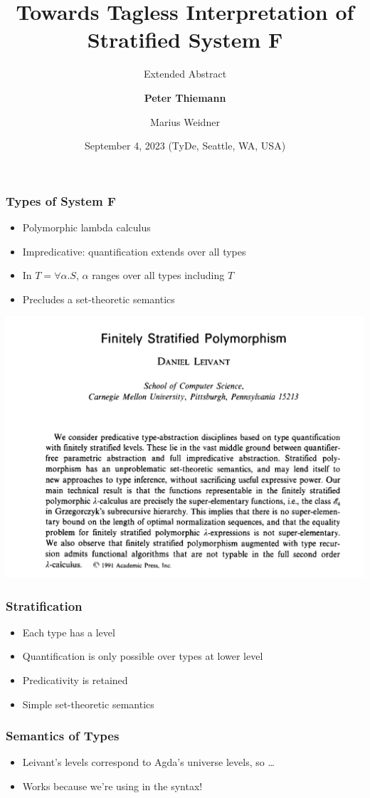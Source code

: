 \documentclass[dvipsnames,aspectratio=169,pdftex]{beamer}
\title{Towards Tagless Interpretation of Stratified System F}
\subtitle{Extended Abstract}
\author[Thiemann, Weidner]
{
\textbf{Peter Thiemann} \and
{Marius Weidner} 
}
\institute{University of Freiburg, Germany
}
\date{September 4, 2023 (TyDe, Seattle, WA, USA)}
\begin{document}
\begin{frame}{\null}
  \titlepage 
\end{frame}
\begin{frame}
  \frametitle{Types of System F}
  \SFType
  \begin{itemize}
  \item Polymorphic lambda calculus
  \item Impredicative: quantification extends over all types
  \item In $T = \forall \alpha.S$, $\alpha$ ranges over all types including $T$
  \item Precludes a set-theoretic semantics
  \end{itemize}
\end{frame}
\begin{frame}
  \begin{center}
    \includegraphics[scale=0.25]{images/FinitelyStratifiedPolymorphism.png}
  \end{center}
\end{frame}
\begin{frame}
  \frametitle{Stratification}
  \begin{itemize}
  \item Each type has a level
  \item Quantification is only possible over types at lower level
  \item Predicativity is retained
  \item Simple set-theoretic semantics
  \end{itemize}
  \pause
  \TFType
\end{frame}
\begin{frame}
  \frametitle{Semantics of Types}
  \begin{itemize}
  \item Leivant's levels correspond to Agda's universe levels, so \dots
  \end{itemize}
  \pause
  \TFTEnvP
  \pause\vspace{-2\baselineskip}
  \TFTSemP
  \begin{itemize}
  \item Works because we're using  in the syntax!
  \end{itemize}
\end{frame}
\end{document}
